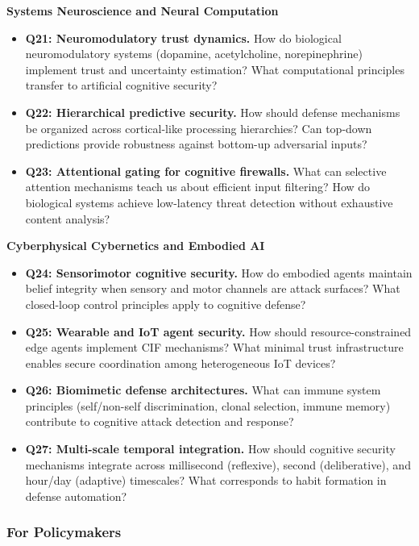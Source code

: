 \documentclass[
]{article}
\begin{document}
\textbf{Systems Neuroscience and Neural Computation}

\begin{itemize}
\item
  \textbf{Q21: Neuromodulatory trust dynamics.} How do biological
  neuromodulatory systems (dopamine, acetylcholine, norepinephrine)
  implement trust and uncertainty estimation? What computational
  principles transfer to artificial cognitive security?
\item
  \textbf{Q22: Hierarchical predictive security.} How should defense
  mechanisms be organized across cortical-like processing hierarchies?
  Can top-down predictions provide robustness against bottom-up
  adversarial inputs?
\item
  \textbf{Q23: Attentional gating for cognitive firewalls.} What can
  selective attention mechanisms teach us about efficient input
  filtering? How do biological systems achieve low-latency threat
  detection without exhaustive content analysis?
\end{itemize}

\textbf{Cyberphysical Cybernetics and Embodied AI}

\begin{itemize}
\item
  \textbf{Q24: Sensorimotor cognitive security.} How do embodied agents
  maintain belief integrity when sensory and motor channels are attack
  surfaces? What closed-loop control principles apply to cognitive
  defense?
\item
  \textbf{Q25: Wearable and IoT agent security.} How should
  resource-constrained edge agents implement CIF mechanisms? What
  minimal trust infrastructure enables secure coordination among
  heterogeneous IoT devices?
\item
  \textbf{Q26: Biomimetic defense architectures.} What can immune system
  principles (self/non-self discrimination, clonal selection, immune
  memory) contribute to cognitive attack detection and response?
\item
  \textbf{Q27: Multi-scale temporal integration.} How should cognitive
  security mechanisms integrate across millisecond (reflexive), second
  (deliberative), and hour/day (adaptive) timescales? What corresponds
  to habit formation in defense automation?
\end{itemize}

\subsubsection{For Policymakers}\label{for-policymakers}
\end{document}
